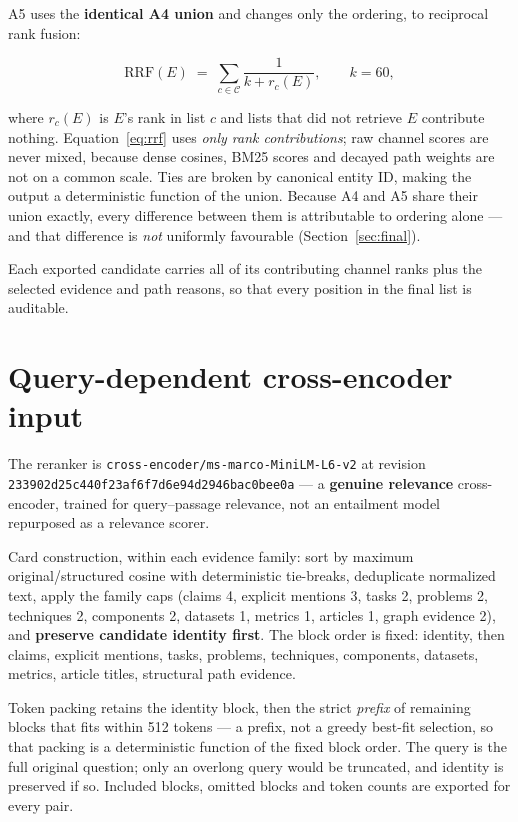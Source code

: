 \documentclass[11pt,a4paper]{article}
\newcommand{\hx}[2]{\texttt{#1}\allowbreak\texttt{#2}}
\begin{document}
A5 uses the \textbf{identical A4 union} and changes only the ordering, to reciprocal rank fusion:

\begin{equation}
\mathrm{RRF}(E) \;=\; \sum_{c \in \mathcal{C}} \frac{1}{k + r_c(E)},
\qquad k = 60,
\label{eq:rrf}
\end{equation}

where $r_c(E)$ is $E$'s rank in list $c$ and lists that did not retrieve $E$ contribute nothing.
Equation~\eqref{eq:rrf} uses \emph{only rank contributions}; raw channel scores are never mixed, because
dense cosines, BM25 scores and decayed path weights are not on a common scale. Ties are broken by canonical
entity ID, making the output a deterministic function of the union. Because A4 and A5 share their union
exactly, every difference between them is attributable to ordering alone --- and that difference is
\emph{not} uniformly favourable (Section~\ref{sec:final}).

Each exported candidate carries all of its contributing channel ranks plus the selected evidence and path
reasons, so that every position in the final list is auditable.

\section{Query-dependent cross-encoder input}
\label{sec:ce}

The reranker is \texttt{cross-encoder/ms-marco-MiniLM-L6-v2} at revision
\hx{233902d25c440f23af6f}{7d6e94d2946bac0bee0a} --- a \textbf{genuine relevance} cross-encoder, trained for
query--passage relevance, not an entailment model repurposed as a relevance scorer.

Card construction, within each evidence family: sort by maximum original/structured cosine with
deterministic tie-breaks, deduplicate normalized text, apply the family caps (claims 4, explicit mentions 3,
tasks 2, problems 2, techniques 2, components 2, datasets 1, metrics 1, articles 1, graph evidence 2), and
\textbf{preserve candidate identity first}. The block order is fixed: identity, then claims, explicit
mentions, tasks, problems, techniques, components, datasets, metrics, article titles, structural path
evidence.

Token packing retains the identity block, then the strict \emph{prefix} of remaining blocks that fits within
512 tokens --- a prefix, not a greedy best-fit selection, so that packing is a deterministic function of the
fixed block order. The query is the full original question; only an overlong query would be truncated, and
identity is preserved if so. Included blocks, omitted blocks and token counts are exported for every pair.
\end{document}
